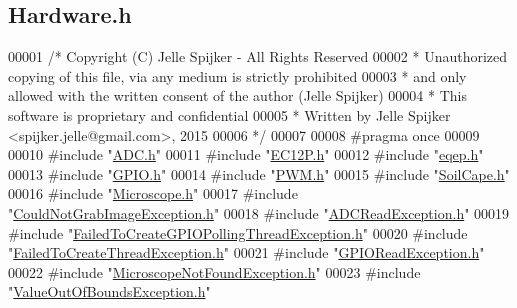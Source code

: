 \hypertarget{_hardware_8h_source}{}\subsection{Hardware.\+h}
\label{_hardware_8h_source}

\begin{DoxyCode}
00001 \textcolor{comment}{/* Copyright (C) Jelle Spijker - All Rights Reserved}
00002 \textcolor{comment}{ * Unauthorized copying of this file, via any medium is strictly prohibited}
00003 \textcolor{comment}{ * and only allowed with the written consent of the author (Jelle Spijker)}
00004 \textcolor{comment}{ * This software is proprietary and confidential}
00005 \textcolor{comment}{ * Written by Jelle Spijker <spijker.jelle@gmail.com>, 2015}
00006 \textcolor{comment}{ */}
00007 
00008 \textcolor{preprocessor}{#pragma once}
00009 
00010 \textcolor{preprocessor}{#include "\hyperlink{_a_d_c_8h}{ADC.h}"}
00011 \textcolor{preprocessor}{#include "\hyperlink{_e_c12_p_8h}{EC12P.h}"}
00012 \textcolor{preprocessor}{#include "\hyperlink{eqep_8h}{eqep.h}"}
00013 \textcolor{preprocessor}{#include "\hyperlink{_g_p_i_o_8h}{GPIO.h}"}
00014 \textcolor{preprocessor}{#include "\hyperlink{_p_w_m_8h}{PWM.h}"}
00015 \textcolor{preprocessor}{#include "\hyperlink{_soil_cape_8h}{SoilCape.h}"}
00016 \textcolor{preprocessor}{#include "\hyperlink{_microscope_8h}{Microscope.h}"}
00017 \textcolor{preprocessor}{#include "\hyperlink{_could_not_grab_image_exception_8h}{CouldNotGrabImageException.h}"}
00018 \textcolor{preprocessor}{#include "\hyperlink{_a_d_c_read_exception_8h}{ADCReadException.h}"}
00019 \textcolor{preprocessor}{#include "\hyperlink{_failed_to_create_g_p_i_o_polling_thread_exception_8h}{FailedToCreateGPIOPollingThreadException.h}"}
00020 \textcolor{preprocessor}{#include "\hyperlink{_failed_to_create_thread_exception_8h}{FailedToCreateThreadException.h}"}
00021 \textcolor{preprocessor}{#include "\hyperlink{_g_p_i_o_read_exception_8h}{GPIOReadException.h}"}
00022 \textcolor{preprocessor}{#include "\hyperlink{_microscope_not_found_exception_8h}{MicroscopeNotFoundException.h}"}
00023 \textcolor{preprocessor}{#include "\hyperlink{_value_out_of_bounds_exception_8h}{ValueOutOfBoundsException.h}"}
\end{DoxyCode}
